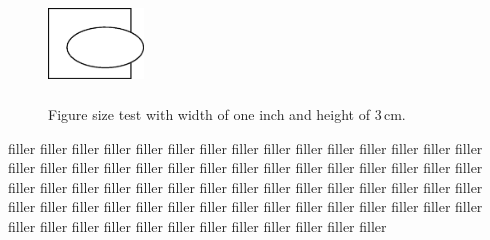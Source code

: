 \documentclass{article}
\begin{document}
\begin{figure}
\begin{center}
\includegraphics[width=1in,height=3cm]{fig_oval.png}
\caption{Figure size test with width of one inch and height of 3\,cm.} 
\end{center}
\end{figure}

filler filler filler filler filler filler filler filler filler filler filler filler
filler filler filler filler filler filler filler filler filler filler filler filler
filler filler filler filler filler filler filler filler filler filler filler filler
filler filler filler filler filler filler filler filler filler filler filler filler
filler filler filler filler filler filler filler filler filler filler filler filler
filler filler filler filler filler filler filler filler filler filler filler filler
\end{document}

